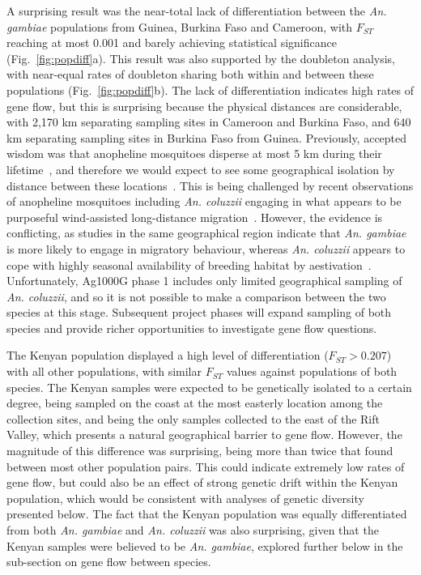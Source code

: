 \documentclass[a4paper,11pt,abstracton,hidelinks]{scrartcl}
\begin{document}
A surprising result was the near-total lack of differentiation between the \textit{An. gambiae} populations from Guinea, Burkina Faso and Cameroon, with $F_{ST}$ reaching at most 0.001 and barely achieving statistical significance (Fig.~\ref{fig:popdiff}a).
%
This result was also supported by the doubleton analysis, with near-equal rates of doubleton sharing both within and between these populations (Fig.~\ref{fig:popdiff}b).
%
The lack of differentiation indicates high rates of gene flow, but this is surprising because the physical distances are considerable, with 2,170 km separating sampling sites in Cameroon and Burkina Faso, and 640 km separating sampling sites in Burkina Faso from Guinea.
%
Previously, accepted wisdom was that anopheline mosquitoes disperse at most 5 km during their lifetime~\parencite{Service1997}, and therefore we would expect to see some geographical isolation by distance between these locations~\parencite{Rousset1997}.
%
This is being challenged by recent observations of anopheline mosquitoes including \textit{An. coluzzii} engaging in what appears to be purposeful wind-assisted long-distance migration~\parencite{Huestis2019}.
%
However, the evidence is conflicting, as studies in the same geographical region indicate that \textit{An. gambiae} is more likely to engage in migratory behaviour, whereas \textit{An. coluzzii} appears to cope with highly seasonal availability of breeding habitat by aestivation~\parencite{Dao2014}.
%
Unfortunately, Ag1000G phase 1 includes only limited geographical sampling of \textit{An. coluzzii}, and so it is not possible to make a comparison between the two species at this stage.
%
Subsequent project phases will expand sampling of both species and provide richer opportunities to investigate gene flow questions.


The Kenyan population displayed a high level of differentiation ($F_{ST} > 0.207$) with all other populations, with similar $F_{ST}$ values against populations of both species.
%
The Kenyan samples were expected to be genetically isolated to a certain degree, being sampled on the coast at the most easterly location among the collection sites, and being the only samples collected to the east of the Rift Valley, which presents a natural geographical barrier to gene flow.
%
However, the magnitude of this difference was surprising, being more than twice that found between most other population pairs.
%
This could indicate extremely low rates of gene flow, but could also be an effect of strong genetic drift within the Kenyan population, which would be consistent with analyses of genetic diversity presented below.
%
The fact that the Kenyan population was equally differentiated from both \textit{An. gambiae} and \textit{An. coluzzii} was also surprising, given that the Kenyan samples were believed to be \textit{An. gambiae}, explored further below in the sub-section on gene flow between species.
\end{document}
